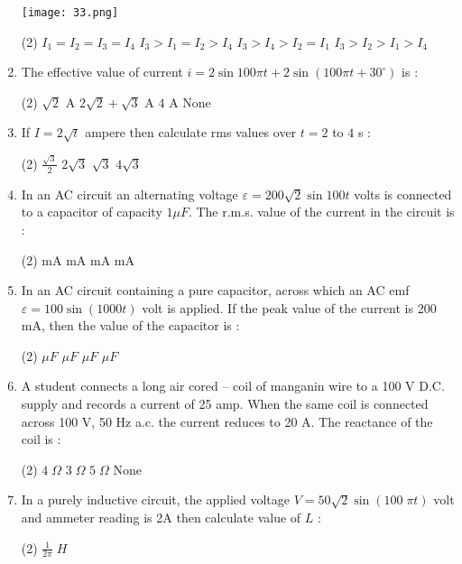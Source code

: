 \documentclass{article}
\begin{document}
\begin{enumerate}
\texttt{[image: 33.png]}

\begin{tasks}(2)
\task \( I_1 = I_2 = I_3 = I_4 \)
\task \( I_3 > I_1 = I_2 > I_4 \)
\task \( I_3 > I_4 > I_2 = I_1 \)
\task \( I_3 > I_2 > I_1 > I_4 \)
\end{tasks}
\item The effective value of current \(  i = 2 \sin 100 \pi t + 2 \sin(100 \pi t + 30^\circ) \) is :
\begin{tasks}(2)
\task \( \sqrt{2} \) A
\task \( 2\sqrt{2} + \sqrt{3} \) A
\task \( 4 \) A
\task None
\end{tasks}
\item If \( I = 2\sqrt{t} \) ampere then calculate rms values over \( t = 2 \) to \( 4 \) s :
\begin{tasks}(2)
\task \( \displaystyle \frac{\sqrt{3}}{2} \)
\task \( 2\sqrt{3} \)
\task \( \sqrt{3} \)
\task \( 4\sqrt{3} \)
\end{tasks}
\item In an AC circuit an alternating voltage \( \varepsilon = 200\sqrt{2} \sin 100 t \) volts is connected to a capacitor of capacity \( 1\mu F \). The r.m.s. value of the current in the circuit is :
\begin{tasks}(2)
 mA
 mA
 mA
 mA
\end{tasks}
\item In an AC circuit containing a pure capacitor, across which an AC emf \( \varepsilon = 100 \sin(1000t) \) volt is applied. If the peak value of the current is 200 mA, then the value of the capacitor is :
\begin{tasks}(2)
 \(\mu F\)
 \(\mu F\)
 \(\mu F\)
 \(\mu F\)
\end{tasks}
\item A student connects a long air cored – coil of manganin wire to a 100 V D.C. supply and records a current of 25 amp. When the same coil is connected across 100 V, 50 Hz a.c. the current reduces to 20 A. The reactance of the coil is :
\begin{tasks}(2)
\task \( 4 \;\Omega \)
\task \( 3 \;\Omega \)
\task \( 5 \;\Omega \)
\task None
\end{tasks}
\item In a purely inductive circuit, the applied voltage \( V = 50\sqrt{2} \sin (100\;\pi t) \) volt and ammeter reading is 2A then calculate value of \( L \) :
\begin{tasks}(2)
\task \( \displaystyle \frac{1}{2\pi} \;H \)

\end{tasks}
\end{enumerate}
\end{document}
